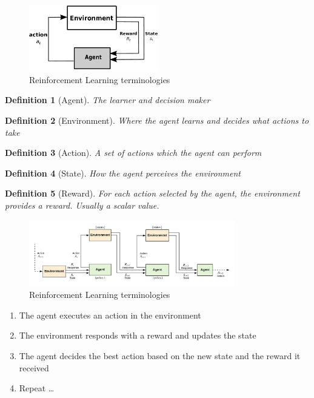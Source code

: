 \documentclass{article}
\newtheorem{theorem}{Definition}[section]
\begin{document}
\begin{figure}[H]
    \centering
    \includegraphics[width=0.5\textwidth]{img/rl-terminologies.png}
    \caption{Reinforcement Learning terminologies}
\end{figure}

\begin{theorem}[Agent]
    The learner and decision maker
\end{theorem}

\begin{theorem}[Environment]
    Where the agent learns and decides what actions to take
\end{theorem}

\begin{theorem}[Action]
    A set of actions which the agent can perform
\end{theorem}

\begin{theorem}[State]
    How the agent perceives the environment
\end{theorem}

\begin{theorem}[Reward]
    For each action selected by the agent, the environment provides a reward.
    Usually a scalar value.
\end{theorem}


\begin{figure}[H]
    \centering
    \includegraphics[width=0.8\textwidth]{img/rl-terminologies2.png}
    \caption{Reinforcement Learning terminologies}
\end{figure}

\begin{enumerate}
    \item The agent executes an action in the environment
    \item The environment responds with a reward and updates the state
    \item The agent decides the best action based on the new state and the reward it received
    \item Repeat \dots
\end{enumerate}
\end{document}

